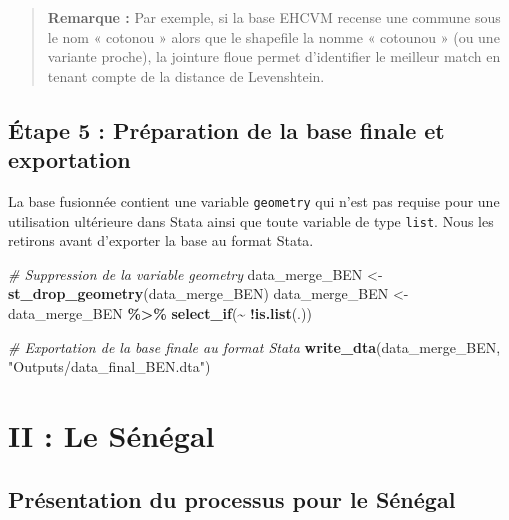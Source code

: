 \documentclass[
]{article}
\newenvironment{Shaded}{\begin{snugshade}}{\end{snugshade}}
\newcommand{\CommentTok}[1]{\textcolor[rgb]{0.56,0.35,0.01}{\textit{#1}}}
\newcommand{\FunctionTok}[1]{\textcolor[rgb]{0.13,0.29,0.53}{\textbf{#1}}}
\newcommand{\NormalTok}[1]{#1}
\newcommand{\OtherTok}[1]{\textcolor[rgb]{0.56,0.35,0.01}{#1}}
\newcommand{\SpecialCharTok}[1]{\textcolor[rgb]{0.81,0.36,0.00}{\textbf{#1}}}
\newcommand{\StringTok}[1]{\textcolor[rgb]{0.31,0.60,0.02}{#1}}
\begin{document}
\begin{quote}
\textbf{Remarque :} Par exemple, si la base EHCVM recense une commune
sous le nom « cotonou » alors que le shapefile la nomme « cotounou » (ou
une variante proche), la jointure floue permet d'identifier le meilleur
match en tenant compte de la distance de Levenshtein.
\end{quote}

\hypertarget{uxe9tape-5-pruxe9paration-de-la-base-finale-et-exportation}{%
\subsection{Étape 5 : Préparation de la base finale et
exportation}\label{uxe9tape-5-pruxe9paration-de-la-base-finale-et-exportation}}

La base fusionnée contient une variable \texttt{geometry} qui n'est pas
requise pour une utilisation ultérieure dans Stata ainsi que toute
variable de type \texttt{list}. Nous les retirons avant d'exporter la
base au format Stata.

\begin{Shaded}
\begin{Highlighting}[]
\CommentTok{\# Suppression de la variable geometry}
\NormalTok{data\_merge\_BEN }\OtherTok{\textless{}{-}} \FunctionTok{st\_drop\_geometry}\NormalTok{(data\_merge\_BEN)}
\NormalTok{data\_merge\_BEN }\OtherTok{\textless{}{-}}\NormalTok{ data\_merge\_BEN }\SpecialCharTok{\%\textgreater{}\%} \FunctionTok{select\_if}\NormalTok{(}\SpecialCharTok{\textasciitilde{}} \SpecialCharTok{!}\FunctionTok{is.list}\NormalTok{(.))}

\CommentTok{\# Exportation de la base finale au format Stata}
\FunctionTok{write\_dta}\NormalTok{(data\_merge\_BEN, }\StringTok{"Outputs/data\_final\_BEN.dta"}\NormalTok{)}
\end{Highlighting}
\end{Shaded}

\hypertarget{ii-le-suxe9nuxe9gal}{%
\section{II : Le Sénégal}\label{ii-le-suxe9nuxe9gal}}

\hypertarget{pruxe9sentation-du-processus-pour-le-suxe9nuxe9gal}{%
\subsection{Présentation du processus pour le
Sénégal}\label{pruxe9sentation-du-processus-pour-le-suxe9nuxe9gal}}
\end{document}
